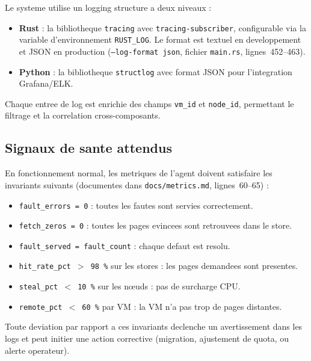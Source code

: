 Le systeme utilise un logging structure a deux niveaux :

\begin{itemize}
    \item \textbf{Rust} : la bibliotheque \texttt{tracing} avec \texttt{tracing-subscriber}, configurable via la variable d'environnement \texttt{RUST\_LOG}. Le format est textuel en developpement et JSON en production (\texttt{--log-format json}, fichier \texttt{main.rs}, lignes~452--463).
    \item \textbf{Python} : la bibliotheque \texttt{structlog} avec format JSON pour l'integration Grafana/ELK.
\end{itemize}

Chaque entree de log est enrichie des champs \texttt{vm\_id} et \texttt{node\_id}, permettant le filtrage et la correlation cross-composants.

\subsection{Signaux de sante attendus}
\label{subsec:signaux-sante}

En fonctionnement normal, les metriques de l'agent doivent satisfaire les invariants suivants (documentes dans \texttt{docs/metrics.md}, lignes~60--65) :

\begin{itemize}
    \item \texttt{fault\_errors = 0} : toutes les fautes sont servies correctement.
    \item \texttt{fetch\_zeros = 0} : toutes les pages evincees sont retrouvees dans le store.
    \item \texttt{fault\_served = fault\_count} : chaque defaut est resolu.
    \item \texttt{hit\_rate\_pct $>$ 98\,\%} sur les stores : les pages demandees sont presentes.
    \item \texttt{steal\_pct $<$ 10\,\%} sur les nœuds : pas de surcharge CPU.
    \item \texttt{remote\_pct $<$ 60\,\%} par VM : la VM n'a pas trop de pages distantes.
\end{itemize}

Toute deviation par rapport a ces invariants declenche un avertissement dans les logs et peut initier une action corrective (migration, ajustement de quota, ou alerte operateur).

